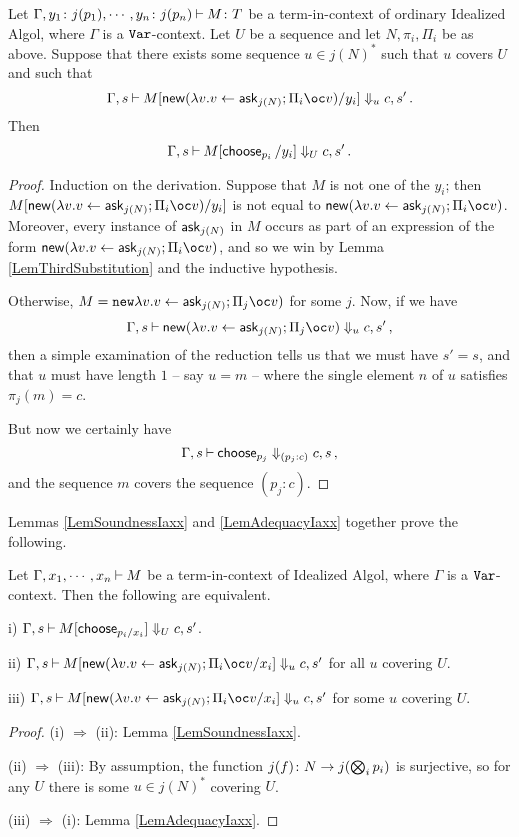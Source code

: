 \documentclass{report}[11pt]
\begin{document}
\begin{lemma}
  Let $\Gamma,y_1\colon j(p_1),\cdots,y_n\colon j(p_n) \mathbin{\vdash} M \colon T$ be a term-in-context of ordinary Idealized Algol, where $\Gamma$ is a ${\mathtt{Var}}$-context.  
  Let $U$ be a sequence and let $N,\pi_i,\Pi_i$ be as above.
  Suppose that there exists some sequence $u\in j(N)^*$ such that $u$ covers $U$ and such that
  \[
    \Gamma,s\ts M[\neww(\lambda v.v\gets \ask_{j(N)};\Pi_i \oc v)/y_i]\converges_u c,s'\,.
    \]
  Then
  \[
    \Gamma,s\mathbin{\vdash} M[\operatorname{\mathsf{choose}}_{p_i}/y_i] \Downarrow_U c,s'\,.
    \]
  \label{LemAdequacyIaxx}
\end{lemma}
\begin{proof}
  Induction on the derivation.
  Suppose that $M$ is not one of the $y_i$; then $M[\neww(\lambda v.v\gets\ask_{j(N)};\Pi_i \oc v)/y_i]$ is not equal to $\neww(\lambda v.v\gets\ask_{j(N)};\Pi_i \oc v)$.
  Moreover, every instance of $\operatorname{{\mathsf{ask}}}_{j(N)}$ in $M$ occurs as part of an expression of the form $\neww(\lambda v.v\gets\ask_{j(N)};\Pi_i \oc v)$, and so we win by Lemma \ref{LemThirdSubstitution} and the inductive hypothesis.

  Otherwise, $M=\new\lambda v.v\gets \ask_{j(N)};\Pi_j\oc v)$ for some $j$.  
  Now, if we have
  \[
    \Gamma,s\ts \neww(\lambda v.v\gets\ask_{j(N)};\Pi_j\oc v)\converges_u c,s'\,,
    \]
  then a simple examination of the reduction tells us that we must have $s'=s$, and that $u$ must have length $1$ -- say $u=m$ -- where the single element $n$ of $u$ satisfies $\pi_j(m)=c$.

  But now we certainly have
  \[
    \Gamma,s\mathbin{\vdash} \operatorname{\mathsf{choose}}_{p_j} \Downarrow_{(p_j:c)} c,s\,,
    \]
  and the sequence $m$ covers the sequence $(p_j:c)$.
\end{proof}

Lemmas \ref{LemSoundnessIaxx} and \ref{LemAdequacyIaxx} together prove the following.

\begin{lemma}
  Let $\Gamma,x_1,\cdots,x_n\mathbin{\vdash} M$ be a term-in-context of Idealized Algol, where $\Gamma$ is a ${\mathtt{Var}}$-context.
  Then the following are equivalent.

  i) $\Gamma,s\mathbin{\vdash} M[\operatorname{\mathsf{choose}}_{p_i/x_i}]\Downarrow_U c,s'$.
  
  ii) $\Gamma,s\ts M[\neww(\lambda v.v\gets\ask_{j(N)};\Pi_i \oc v/x_i]\converges_u c,s'$ for all $u$ covering $U$.

  iii) $\Gamma,s\ts M[\neww(\lambda v.v\gets\ask_{j(N)};\Pi_i \oc v/x_i]\converges_u c,s'$ for some $u$ covering $U$.
  \label{LemComputationalAdequacyIaxx}
\end{lemma}
\begin{proof}
  (i) $\Rightarrow$ (ii): Lemma \ref{LemSoundnessIaxx}.

  (ii) $\Rightarrow$ (iii): By assumption, the function $j(f) \colon N \to j(\bigotimes_i p_i)$ is surjective, so for any $U$ there is some $u\in j(N)^*$ covering $U$.

  (iii) $\Rightarrow$ (i): Lemma \ref{LemAdequacyIaxx}.
\end{proof}
\end{document}
